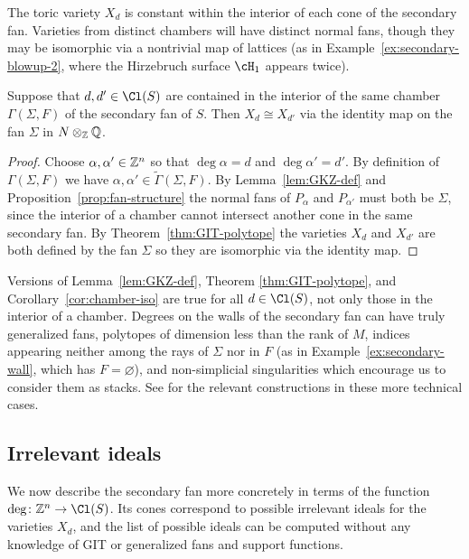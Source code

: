\documentclass{article}
\begin{document}
The toric variety $X_d$ is constant within the interior of each cone of the secondary fan.  Varieties from distinct chambers will have distinct normal fans, though they may be isomorphic via a nontrivial map of lattices (as in Example~\ref{ex:secondary-blowup-2}, where the Hirzebruch surface $\cH_1$ appears twice).

\begin{cor}\label{cor:chamber-iso}
  Suppose that $d,d'\in\Cl(S)$ are contained in the interior of the same chamber $\Gamma(\Sigma,F)$ of the secondary fan of $S$.  Then $X_d\cong X_{d'}$ via the identity map on the fan $\Sigma$ in $N\otimes_\mathbb Z\mathbb Q$.
\end{cor}

\begin{proof}
  Choose $\alpha,\alpha'\in\mathbb Z^n$ so that $\deg\alpha=d$ and $\deg\alpha'=d'$.  By definition of $\Gamma(\Sigma,F)$ we have $\alpha,\alpha'\in\tilde\Gamma(\Sigma,F)$.  By Lemma~\ref{lem:GKZ-def} and Proposition~\ref{prop:fan-structure} the normal fans of $P_\alpha$ and $P_{\alpha'}$ must both be $\Sigma$, since the interior of a chamber cannot intersect another cone in the same secondary fan.  By Theorem~\ref{thm:GIT-polytope} the varieties $X_d$ and $X_{d'}$ are both defined by the fan $\Sigma$ so they are isomorphic via the identity map.
\end{proof}

\begin{rem}\label{rem:walls}
  Versions of Lemma~\ref{lem:GKZ-def}, Theorem \ref{thm:GIT-polytope}, and Corollary~\ref{cor:chamber-iso} are true for all $d\in\Cl(S)$, not only those in the interior of a chamber.  Degrees on the walls of the secondary fan can have truly generalized fans, polytopes of dimension less than the rank of $M$, indices appearing neither among the rays of $\Sigma$ nor in $F$ (as in Example~\ref{ex:secondary-wall}, which has $F=\varnothing$), and non-simplicial singularities which encourage us to consider them as stacks.  See \cite{BEF26} for the relevant constructions in these more technical cases.
\end{rem}

\subsection{Irrelevant ideals}\label{sec:irrelevant-ideals}

We now describe the secondary fan more concretely in terms of the function $\deg\colon\ZZ^n\to\Cl(S)$.  Its cones correspond to possible irrelevant ideals for the varieties $X_d$, and the list of possible ideals can be computed without any knowledge of GIT or generalized fans and support functions.
\end{document}
